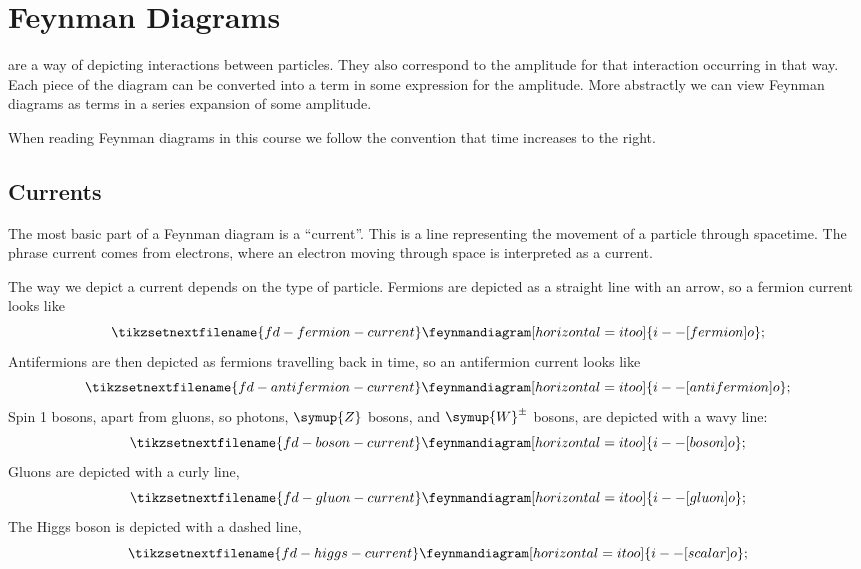 \documentclass[fleqn]{NotesClass}
\newcommand{\Pparticle}[1]{\symup{#1}}
\newcommand{\PZ}{\ensuremath{\Pparticle{Z}}}
\newcommand{\PWpm}{\ensuremath{\Pparticle{W}^{\pm}}}
\begin{document}
    \chapter{Feynman Diagrams}
     are a way of depicting interactions between particles.
    They also correspond to the amplitude for that interaction occurring in that way.
    Each piece of the diagram can be converted into a term in some expression for the amplitude.
    More abstractly we can view Feynman diagrams as terms in a series expansion of some amplitude.
    
    When reading Feynman diagrams in this course we follow the convention that time increases to the right.
    
    \section{Currents}
    The most basic part of a Feynman diagram is a \enquote{current}.
    This is a line representing the movement of a particle through spacetime.
    The phrase current comes from electrons, where an electron moving through space is interpreted as a current.
    
    The way we depict a current depends on the type of particle.
    Fermions are depicted as a straight line with an arrow, so a fermion current looks like
    \begin{equation}
        \tikzsetnextfilename{fd-fermion-current}
        \feynmandiagram [horizontal=i to o] {
            i -- [fermion] o
        };
    \end{equation}
    Antifermions are then depicted as fermions travelling back in time, so an antifermion current looks like
    \begin{equation}
        \tikzsetnextfilename{fd-antifermion-current}
        \feynmandiagram [horizontal=i to o] {
            i -- [anti fermion] o
        };
    \end{equation}
    Spin 1 bosons, apart from gluons, so photons, \PZ{} bosons, and \PWpm{} bosons, are depicted with a wavy line:
    \begin{equation}
        \tikzsetnextfilename{fd-boson-current}
        \feynmandiagram [horizontal=i to o] {
            i -- [boson] o
        };
    \end{equation}
    Gluons are depicted with a curly line,
    \begin{equation}
        \tikzsetnextfilename{fd-gluon-current}
        \feynmandiagram [horizontal=i to o] {
            i -- [gluon] o
        };
    \end{equation}
    The Higgs boson is depicted with a dashed line,
    \begin{equation}
        \tikzsetnextfilename{fd-higgs-current}
        \feynmandiagram [horizontal=i to o] {
            i -- [scalar] o
        };
    \end{equation}
    
\end{document}
